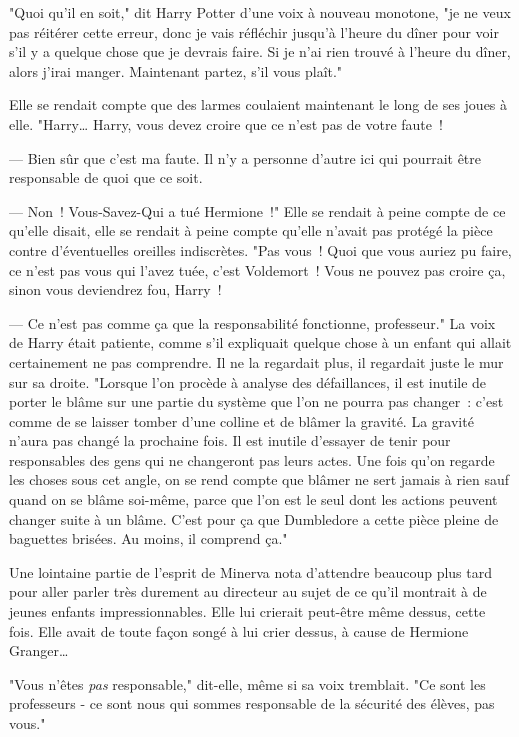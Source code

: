 "Quoi qu'il en soit," dit Harry Potter d'une voix à nouveau monotone, "je ne veux pas réitérer cette erreur, donc je vais réfléchir jusqu'à l'heure du dîner pour voir s'il y a quelque chose que je devrais faire. Si je n'ai rien trouvé à l'heure du dîner, alors j'irai manger. Maintenant partez, s'il vous plaît."

Elle se rendait compte que des larmes coulaient maintenant le long de ses joues à elle. "Harry… Harry, vous devez croire que ce n'est pas de votre faute~!

--- Bien sûr que c'est ma faute. Il n'y a personne d'autre ici qui pourrait être responsable de quoi que ce soit.

--- Non~! Vous-Savez-Qui a tué Hermione~!" Elle se rendait à peine compte de ce qu'elle disait, elle se rendait à peine compte qu'elle n'avait pas protégé la pièce contre d'éventuelles oreilles indiscrètes. "Pas vous~! Quoi que vous auriez pu faire, ce n'est pas vous qui l'avez tuée, c'est Voldemort~! Vous ne pouvez pas croire ça, sinon vous deviendrez fou, Harry~!

--- Ce n'est pas comme ça que la responsabilité fonctionne, professeur." La voix de Harry était patiente, comme s'il expliquait quelque chose à un enfant qui allait certainement ne pas comprendre. Il ne la regardait plus, il regardait juste le mur sur sa droite. "Lorsque l'on procède à analyse des défaillances, il est inutile de porter le blâme sur une partie du système que l'on ne pourra pas changer~: c'est comme de se laisser tomber d'une colline et de blâmer la gravité. La gravité n'aura pas changé la prochaine fois. Il est inutile d'essayer de tenir pour responsables des gens qui ne changeront pas leurs actes. Une fois qu'on regarde les choses sous cet angle, on se rend compte que blâmer ne sert jamais à rien sauf quand on se blâme soi-même, parce que l'on est le seul dont les actions peuvent changer suite à un blâme. C'est pour ça que Dumbledore a cette pièce pleine de baguettes brisées. Au moins, il comprend ça."

Une lointaine partie de l'esprit de Minerva nota d'attendre beaucoup plus tard pour aller parler très durement au directeur au sujet de ce qu'il montrait à de jeunes enfants impressionnables. Elle lui crierait peut-être même dessus, cette fois. Elle avait de toute façon songé à lui crier dessus, à cause de Hermione Granger…

"Vous n'êtes \emph{pas} responsable," dit-elle, même si sa voix tremblait. "Ce sont les professeurs - ce sont nous qui sommes responsable de la sécurité des élèves, pas vous."

